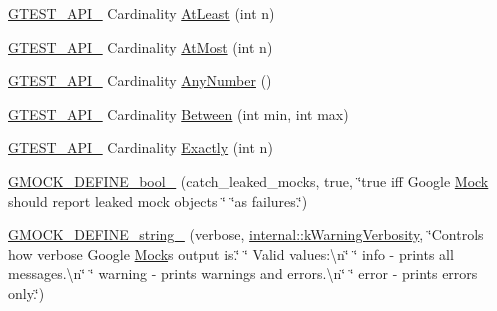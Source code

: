 \begin{DoxyCompactItemize}
\mbox{\hyperlink{_obj__test_2lib_2googletest-release-1_88_81_2googletest_2include_2gtest_2internal_2gtest-port_8h_aa73be6f0ba4a7456180a94904ce17790}{G\+T\+E\+S\+T\+\_\+\+A\+P\+I\+\_\+}} Cardinality \mbox{\hyperlink{namespacetesting_a137297cb3c582843989fbd937cf0fed2}{At\+Least}} (int n)
\item 
\mbox{\hyperlink{_obj__test_2lib_2googletest-release-1_88_81_2googletest_2include_2gtest_2internal_2gtest-port_8h_aa73be6f0ba4a7456180a94904ce17790}{G\+T\+E\+S\+T\+\_\+\+A\+P\+I\+\_\+}} Cardinality \mbox{\hyperlink{namespacetesting_a5487cd1068c78821ced96fbf542a91bb}{At\+Most}} (int n)
\item 
\mbox{\hyperlink{_obj__test_2lib_2googletest-release-1_88_81_2googletest_2include_2gtest_2internal_2gtest-port_8h_aa73be6f0ba4a7456180a94904ce17790}{G\+T\+E\+S\+T\+\_\+\+A\+P\+I\+\_\+}} Cardinality \mbox{\hyperlink{namespacetesting_aa1f8a6371097e1e9b8d6866020f35252}{Any\+Number}} ()
\item 
\mbox{\hyperlink{_obj__test_2lib_2googletest-release-1_88_81_2googletest_2include_2gtest_2internal_2gtest-port_8h_aa73be6f0ba4a7456180a94904ce17790}{G\+T\+E\+S\+T\+\_\+\+A\+P\+I\+\_\+}} Cardinality \mbox{\hyperlink{namespacetesting_a3bb2d3cdd3fdf5b4be1480fce549918e}{Between}} (int min, int max)
\item 
\mbox{\hyperlink{_obj__test_2lib_2googletest-release-1_88_81_2googletest_2include_2gtest_2internal_2gtest-port_8h_aa73be6f0ba4a7456180a94904ce17790}{G\+T\+E\+S\+T\+\_\+\+A\+P\+I\+\_\+}} Cardinality \mbox{\hyperlink{namespacetesting_aa9b1b32ba9e8d3db8ac0af0fc8785c8d}{Exactly}} (int n)
\item 
\mbox{\hyperlink{namespacetesting_aca5af0e8943ba53352537ab84233b47f}{G\+M\+O\+C\+K\+\_\+\+D\+E\+F\+I\+N\+E\+\_\+bool\+\_\+}} (catch\+\_\+leaked\+\_\+mocks, true, \char`\"{}true iff Google \mbox{\hyperlink{class_mock}{Mock}} should report leaked mock objects \char`\"{} \char`\"{}as failures.\char`\"{})
\item 
\mbox{\hyperlink{namespacetesting_a92ea84a47432512152022ef73176676f}{G\+M\+O\+C\+K\+\_\+\+D\+E\+F\+I\+N\+E\+\_\+string\+\_\+}} (verbose, \mbox{\hyperlink{namespacetesting_1_1internal_aa5e3dfc43abf98b8fa8aa864cd208103}{internal\+::k\+Warning\+Verbosity}}, \char`\"{}Controls how verbose Google \mbox{\hyperlink{class_mock}{Mock}}\textquotesingle{}s output is.\char`\"{} \char`\"{}  Valid values\+:\textbackslash{}n\char`\"{} \char`\"{}  info    -\/ prints all messages.\textbackslash{}n\char`\"{} \char`\"{}  warning -\/ prints warnings and errors.\textbackslash{}n\char`\"{} \char`\"{}  error   -\/ prints errors only.\char`\"{})

\end{DoxyCompactItemize}
